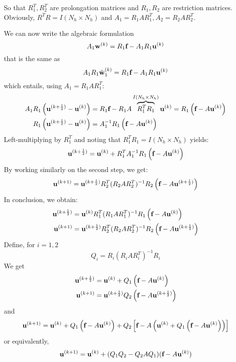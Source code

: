 So that \(R_1^T, R_2^T\) are prolongation matrices and \(R_1, R_2\) are restriction matrices. Obviously, \(R^T R = I(N_h \times N_h)\) and \(A_1 = R_1AR_1^T, A_2 = R_2AR^T_2\).

We can now write the algebraic formulation
\[
    A_1 \textbf{w}^{(k)} = R_1 \textbf{f} -A_1 R_1 \textbf{u}^{(k)}
\]
that is the same as 
\[
    A_1 R_1 \tilde{\textbf{w}}_1^{(k)} = R_1 \textbf{f} - A_1 R_1 \textbf{u}^{(k)}
\]
which entails, using \(A_1 = R_1 A R_1^T\): 
\begin{align*}
    A_1 R_1 \left( \textbf{u}^{(k+\frac{1}{2})} - \textbf{u}^{(k)}\right) &= R_1\textbf{f} - R_1A \overbrace{R_1^T R_1}^{I(N_h \times N_h)} \textbf{u}^{(k)} = R_1\left( \textbf{f} -A\textbf{u}^{(k)} \right) \\
    R_1 \left( \textbf{u}^{(k+\frac{1}{2})} - \textbf{u}^{(k)} \right) &= A^{-1}_1 R_1 \left( \textbf{f} - A\textbf{u}^{(k)} \right)
\end{align*}
Left-multiplying by \(R_1^T\) and noting that \(R_1^T R_1 = I(N_h \times N_h)\) yields:
\[
    \textbf{u}^{(k+\frac{1}{2})} = \textbf{u}^{(k)} + R_1^T A^{-1}_1 R_1 \left( \textbf{f} - A\textbf{u}^{(k)} \right)
\]
By working similarly on the second step, we get: 
\[
    \textbf{u}^{(k+1)} = \textbf{u}^{(k+\frac{1}{2})} R_2^T (R_2AR^T_2)^{-1} R_2 \left( \textbf{f} - A \textbf{u}^{(k+\frac{1}{2})} \right)
\]
In conclusion, we obtain:
\begin{align*}
    \textbf{u}^{(k+\frac{1}{2})} &= \textbf{u}^{(k)} R_1^T (R_1AR^T_1)^{-1} R_1 \left( \textbf{f} - A \textbf{u}^{(k)} \right) \\
    \textbf{u}^{(k+1)} &= \textbf{u}^{(k+\frac{1}{2})} R_2^T (R_2AR^T_2)^{-1} R_2 \left( \textbf{f} - A \textbf{u}^{(k+\frac{1}{2})} \right)
\end{align*}
Define, for \(i = 1,2\) 
\[
    Q_i = R_i(R_iAR_i^T)^{-1} R_i
\]
We get 
\begin{align*}
    \textbf{u}^{(k+\frac{1}{2})} &= \textbf{u}^{(k)} + Q_1 \left( \textbf{f} - A\textbf{u}^{(k)} \right) \\
    \textbf{u}^{(k+1)} &= \textbf{u}^{(k+\frac{1}{2})} Q_2\left( \textbf{f} - A\textbf{u}^{(k+\frac{1}{2})} \right) 
\end{align*}
and 
\[
    \textbf{u}^{(k+1)} = \textbf{u}^{(k)} + Q_1 \left( \textbf{f} - A \textbf{u}^{(k)} \right) + Q_2 \left[ \textbf{f} - A \left( \textbf{u}^{(k)} + Q_1 \left( \textbf{f} - A \textbf{u}^{(k)} \right) \right) \right]
\]
or equivalently, 
\[
    \textbf{u}^{(k+1)} = \textbf{u}^{(k)} + (Q_1  Q_2 - Q_2AQ_1) (\textbf{f} - A\textbf{u}^{(k)})
\]
